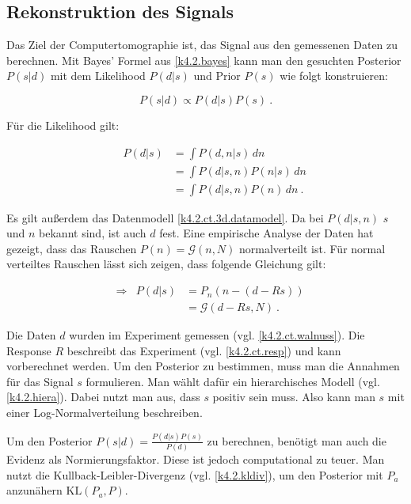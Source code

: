 \subsection{Rekonstruktion des Signals}

Das Ziel der Computertomographie ist, das Signal aus den gemessenen Daten zu berechnen. Mit Bayes' Formel aus \cref{k4.2.bayes} kann man den gesuchten Posterior $P(s|d)$ mit dem Likelihood $P(d|s)$ und Prior $P(s)$ wie folgt konstruieren:

\begin{equation}
  P(s|d) \propto P(d|s)P(s)\ .
\end{equation}

Für die Likelihood gilt:

\begin{equation}
  \begin{aligned}
    && P(d|s) &= \int P(d,n|s) \,dn  \\
    &&  &= \int P(d|s,n) P(n|s) \,dn \\
    && &= \int P(d|s,n) P(n) \,dn \ .
  \end{aligned}
\end{equation}

Es gilt außerdem das Datenmodell \cref{k4.2.ct.3d.datamodel}. Da bei $P(d|s,n)$ $s$ und $n$ bekannt sind, ist auch $d$ fest. Eine empirische Analyse der Daten hat gezeigt, dass das Rauschen $P(n) = \mathcal{G}(n,N)$ normalverteilt ist. Für normal verteiltes Rauschen lässt sich zeigen, dass folgende Gleichung gilt:

\begin{equation}
  \begin{aligned}
    &\Rightarrow& P(d|s) &= P_n(n-(d-Rs)) \\ 
    && &= \mathcal{G}(d-Rs,N) \ .
  \end{aligned}
\end{equation}

Die Daten $d$ wurden im Experiment gemessen (vgl. \cref{k4.2.ct.walnuss}). Die Response $R$ beschreibt das Experiment (vgl. \cref{k4.2.ct.resp}) und kann vorberechnet werden. Um den Posterior zu bestimmen, muss man die Annahmen für das Signal $s$ formulieren. Man wählt dafür ein hierarchisches Modell (vgl. \cref{k4.2.hiera}). Dabei nutzt man aus, dass $s$ positiv sein muss. Also kann man $s$ mit einer Log-Normalverteilung beschreiben. 

Um den Posterior $P(s|d) = \frac{P(d|s)P(s)}{P(d)}$ zu berechnen, benötigt man auch die Evidenz als Normierungsfaktor. Diese ist jedoch computational zu teuer. Man nutzt die Kullback-Leibler-Divergenz (vgl. \cref{k4.2.kldiv}), um den Posterior mit $P_a$ anzunähern $\mathrm{KL}(P_a,P)$. 


